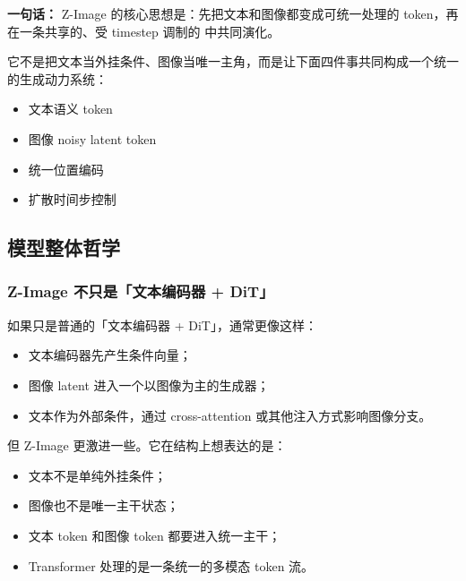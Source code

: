 \begin{conceptbox}
\textbf{一句话：} Z-Image 的核心思想是：先把文本和图像都变成可统一处理的 token，再在一条共享的、受 timestep 调制的  中共同演化。
\end{conceptbox}

它不是把文本当外挂条件、图像当唯一主角，而是让下面四件事共同构成一个统一的生成动力系统：

\begin{itemize}[leftmargin=1.5em]
  \item 文本语义 token
  \item 图像 noisy latent token
  \item 统一位置编码
  \item 扩散时间步控制
\end{itemize}

\subsection{模型整体哲学}

\subsubsection{Z-Image 不只是「文本编码器 + DiT」}

如果只是普通的「文本编码器 + DiT」，通常更像这样：

\begin{itemize}[leftmargin=1.5em]
  \item 文本编码器先产生条件向量；
  \item 图像 latent 进入一个以图像为主的生成器；
  \item 文本作为外部条件，通过 cross-attention 或其他注入方式影响图像分支。
\end{itemize}

但 Z-Image 更激进一些。它在结构上想表达的是：

\begin{itemize}[leftmargin=1.5em]
  \item 文本不是单纯外挂条件；
  \item 图像也不是唯一主干状态；
  \item 文本 token 和图像 token 都要进入统一主干；
  \item Transformer 处理的是一条统一的多模态 token 流。
\end{itemize}

